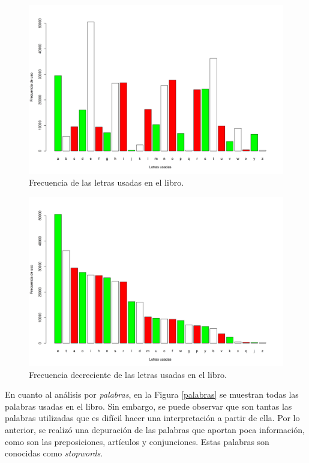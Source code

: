 \documentclass{article}
\begin{document}
\begin{figure}
\centering
\includegraphics[scale=0.55]{Figures/letrasFiltradas.png}
\caption{Frecuencia de las letras usadas en el libro.}
\label{letrasfiltradas}
\end{figure}

\begin{figure}
\centering
\includegraphics[scale=0.5]{Figures/letrasFiltradasDrec.png}
\caption{Frecuencia decreciente de las letras usadas en el libro.}
\label{letrasfiltradasdecr}
\end{figure}

En cuanto al análisis por \emph{palabras}, en la Figura \ref{palabras} se muestran todas las palabras usadas en el libro. Sin embargo, se puede observar que son tantas las palabras utilizadas que es difícil hacer una interpretación a partir de ella. Por lo anterior, se realizó una depuración de las palabras que aportan poca información, como son las preposiciones, artículos y conjunciones. Estas palabras son conocidas como \textit{stopwords}. 
\end{document}
